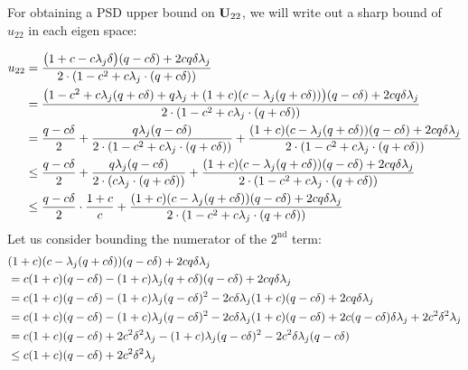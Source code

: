 For obtaining a PSD upper bound on $\mathbf{U}_{22}$, we will write out a sharp bound of $u_{22}$ in each eigen space:
\iffalse
\begin{align*}
u_{22}&=\frac{\big(1+c-c\delta\lambda_j\big)(\g -c\delta)+2c\g \delta\lambda_j}{2\cdot(1-c^2+c\lambda_j\cdot(\g +c\delta))}\nonumber\\
&\leq \frac{1}{2\cnHh\lambda_j} + \frac{\delta}{2}
\end{align*}
Implying, $\U_{22}\preceq\frac{1}{2\cnHh}\cdot\Hinv+\frac{\delta}{2}\cdot\eye$.
\fi
\begin{align*}
u_{22}&=\frac{\big(1+c-c\lambda_j\delta\big)(q -c\delta)+2cq \delta\lambda_j}{2\cdot(1-c^2+c\lambda_j\cdot(q +c\delta))}\nonumber\\
&=\frac{\big(1-c^2+c\lambda_j(q +c\delta)+q\lambda_j+(1+c)(c-\lambda_j(q +c\delta))\big)(q -c\delta)+2cq \delta\lambda_j}{2\cdot(1-c^2+c\lambda_j\cdot(q +c\delta))}\nonumber\\
&=\frac{q -c\delta}{2}+\frac{q\lambda_j(q-c\delta)}{2\cdot(1-c^2+c\lambda_j\cdot(q +c\delta))}+\frac{(1+c)(c-\lambda_j(q +c\delta))(q -c\delta)+2cq \delta\lambda_j}{2\cdot(1-c^2+c\lambda_j\cdot(q +c\delta))}\nonumber\\
&\leq\frac{q -c\delta}{2}+\frac{q\lambda_j(q-c\delta)}{2\cdot(c\lambda_j\cdot(q +c\delta))}+\frac{(1+c)(c-\lambda_j(q +c\delta))(q -c\delta)+2cq \delta\lambda_j}{2\cdot(1-c^2+c\lambda_j\cdot(q +c\delta))}\nonumber\\
&\leq\frac{q -c\delta}{2}\cdot\frac{1+c}{c}+\frac{(1+c)(c-\lambda_j(q +c\delta))(q -c\delta)+2cq \delta\lambda_j}{2\cdot(1-c^2+c\lambda_j\cdot(q +c\delta))}\nonumber
\end{align*}
Let us consider bounding the numerator of the $2^{\text{nd}}$ term:
\begin{align*}
&(1+c)(c-\lambda_j(q +c\delta))(q -c\delta)+2cq \delta\lambda_j\nonumber\\
&=c(1+c)(q -c\delta)-(1+c)\lambda_j(q +c\delta)(q -c\delta)+2cq \delta\lambda_j\nonumber\\
&=c(1+c)(q -c\delta)-(1+c)\lambda_j(q -c\delta)^2-2c\delta\lambda_j(1+c)(q -c\delta)+2cq \delta\lambda_j\nonumber\\
&=c(1+c)(q -c\delta)-(1+c)\lambda_j(q -c\delta)^2-2c\delta\lambda_j(1+c)(q -c\delta)+2c(q -c\delta)\delta\lambda_j+2c^2\delta^2\lambda_j\nonumber\\
&=c(1+c)(q -c\delta)+2c^2\delta^2\lambda_j-(1+c)\lambda_j(q -c\delta)^2-2c^2\delta\lambda_j(q -c\delta)\nonumber\\
&\leq c(1+c)(q -c\delta)+2c^2\delta^2\lambda_j
\end{align*}
